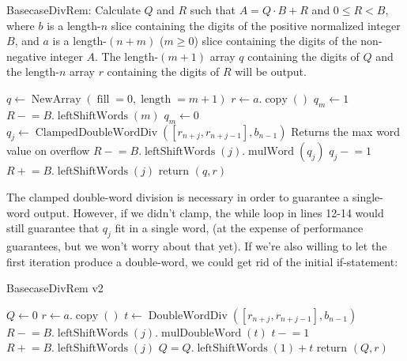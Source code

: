 \documentclass{computer-arithmetic}
\begin{document}
\begin{algorithm}
  \caption{BasecaseDivRem: Calculate \(Q\) and \(R\) such that
    \(A = Q ⋅ B + R\) and \(0 ≤ R < B\), where \(b\) is a length-\(n\)
    slice containing the digits of the positive normalized integer
    \(B\), and \(a\) is a length-\((n + m)\) (\(m ≥ 0\)) slice
    containing the digits of the non-negative integer \(A\). The
    length-\((m+1)\) array \(q\) containing the digits of \(Q\) and
    the length-\(n\) array \(r\) containing the digits of \(R\) will
    be output.}
  \begin{algorithmic}[1]
    \State \(q ← \operatorname{NewArray}(\operatorname{fill}=0, \operatorname{length}=m + 1)\)
\State \(r ← a.\operatorname{copy}()\)
\State \(q_m ← 1\)
\State \(R \mathrel{-}= B.\operatorname{leftShiftWords}(m)\)
\Else
\State \(q_m ← 0\)
\EndIf
{}
\State \(q_j ← \operatorname{ClampedDoubleWordDiv}([r_{n+j}, r_{n + j - 1}], b_{n-1})\)
\Comment Returns the max word value on overflow
\State \(R \mathrel{-}= B.\operatorname{leftShiftWords}(j).\operatorname{mulWord}(q_j)\)
\State \(q_j \mathrel{-}= 1\)
\State \(R \mathrel{+}= B.\operatorname{leftShiftWords}(j)\)
\EndWhile
\EndFor
\State return \((q, r)\)
\end{algorithmic}
\end{algorithm}

The clamped double-word division is necessary in order to guarantee a
single-word output. However, if we didn't clamp, the while loop in
lines 12-14 would still guarantee that \(q_j\) fit in a single word,
(at the expense of performance guarantees, but we won't worry about
that yet). If we're also willing to let the first iteration produce a
double-word, we could get rid of the initial if-statement:

\begin{algorithm}
  \caption{BasecaseDivRem v2}
  \begin{algorithmic}[1]
    \State \(Q ← 0\)
\State \(r ← a.\operatorname{copy}()\)
\State \(t ← \operatorname{DoubleWordDiv}([r_{n+j}, r_{n + j - 1}], b_{n-1})\)
\State \(R \mathrel{-}= B.\operatorname{leftShiftWords}(j).\operatorname{mulDoubleWord}(t)\)
\State \(t \mathrel{-}= 1\)
\State \(R \mathrel{+}= B.\operatorname{leftShiftWords}(j)\)
\EndWhile
\State \(Q = Q.\operatorname{leftShiftWords}(1) + t\)
\EndFor
\State return \((Q, r)\)
\end{algorithmic}
\end{algorithm}
\end{document}
